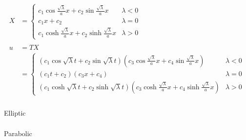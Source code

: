 \documentclass{article}
\begin{document}
\begin{align*}
  X                                     & = \begin{cases}
                                              c_1 \cos \frac{\sqrt{\lambda}}{a} x + c_2 \sin \frac{\sqrt{\lambda}}{a} x   & \lambda < 0 \\
                                              c_1 x + c_2                                                                 & \lambda = 0 \\
                                              c_1 \cosh \frac{\sqrt{\lambda}}{a} x + c_2 \sinh \frac{\sqrt{\lambda}}{a} x & \lambda > 0
                                            \end{cases}                                                             \\ \\
  u                                     & = T X                                                                                                                                                                   \\
                                        & = \begin{cases}
                                              (c_1 \cos \sqrt{\lambda} t + c_2 \sin \sqrt{\lambda} t) (c_3 \cos \frac{\sqrt{\lambda}}{a} x + c_4 \sin \frac{\sqrt{\lambda}}{a} x)     & \lambda < 0 \\
                                              (c_1 t + c_2) (c_3 x + c_4)                                                                                                             & \lambda = 0 \\
                                              (c_1 \cosh \sqrt{\lambda} t + c_2 \sinh \sqrt{\lambda} t) (c_3 \cosh \frac{\sqrt{\lambda}}{a} x + c_4 \sinh \frac{\sqrt{\lambda}}{a} x) & \lambda > 0
                                            \end{cases}
\end{align*}

\setcounter{subsubsection}{16}
\subsubsection{}

Elliptic

\setcounter{subsubsection}{18}
\subsubsection{}

Parabolic
\end{document}
